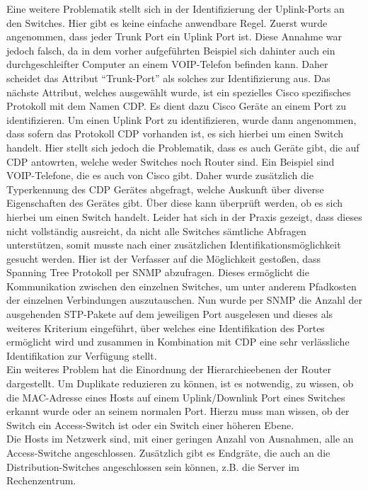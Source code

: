 Eine weitere Problematik stellt sich in der Identifizierung der Uplink-Ports an den Switches. Hier gibt es keine einfache anwendbare Regel. Zuerst wurde angenommen, dass jeder Trunk Port ein Uplink Port ist. Diese Annahme war jedoch falsch, da in dem vorher aufgeführten Beispiel sich dahinter auch ein durchgeschleifter Computer an einem VOIP-Telefon befinden kann. Daher scheidet das Attribut “Trunk-Port” als solches zur Identifizierung aus. Das nächste Attribut, welches ausgewählt wurde, ist ein spezielles Cisco spezifisches Protokoll mit dem Namen CDP. Es dient dazu Cisco Geräte an einem Port zu identifizieren. Um einen Uplink Port zu identifizieren, wurde dann angenommen, dass sofern das Protokoll CDP vorhanden ist, es sich hierbei um einen Switch handelt. Hier stellt sich jedoch die Problematik, dass es auch Geräte gibt, die auf CDP antowrten, welche weder Switches noch Router sind. Ein Beispiel sind VOIP-Telefone, die es auch von Cisco gibt. Daher wurde zusätzlich die Typerkennung des CDP Gerätes abgefragt, welche Auskunft über diverse Eigenschaften des Gerätes gibt. Über diese kann überprüft werden, ob es sich hierbei um einen Switch handelt. Leider hat sich in der Praxis gezeigt, dass dieses nicht vollständig ausreicht, da nicht alle Switches sämtliche Abfragen unterstützen, somit musste nach einer zusätzlichen Identifikationsmöglichkeit gesucht werden.
Hier ist der Verfasser auf die Möglichkeit gestoßen, dass Spanning Tree Protokoll per SNMP abzufragen. Dieses ermöglicht die Kommunikation zwischen den einzelnen Switches, um unter anderem Pfadkosten der einzelnen Verbindungen auszutauschen. Nun wurde per SNMP die Anzahl der ausgehenden STP-Pakete auf dem jeweiligen Port ausgelesen und dieses als weiteres Kriterium eingeführt, über welches eine Identifikation des Portes ermöglicht wird und zusammen in Kombination mit CDP eine sehr verlässliche Identifikation zur Verfügung stellt.\\
Ein weiteres Problem hat die Einordnung der Hierarchieebenen der Router dargestellt. Um Duplikate reduzieren zu können, ist es notwendig, zu wissen, ob die MAC-Adresse eines Hosts auf einem Uplink/Downlink Port eines Switches erkannt wurde oder an seinem normalen Port. Hierzu muss man wissen, ob der Switch ein Access-Switch ist oder ein Switch einer höheren Ebene.\\

Die Hosts im Netzwerk sind, mit einer geringen Anzahl von Ausnahmen, alle an Access-Switche angeschlossen.
Zusätzlich gibt es Endgräte, die auch an die Distribution-Switches angeschlossen sein können, z.B. die Server im Rechenzentrum. 

